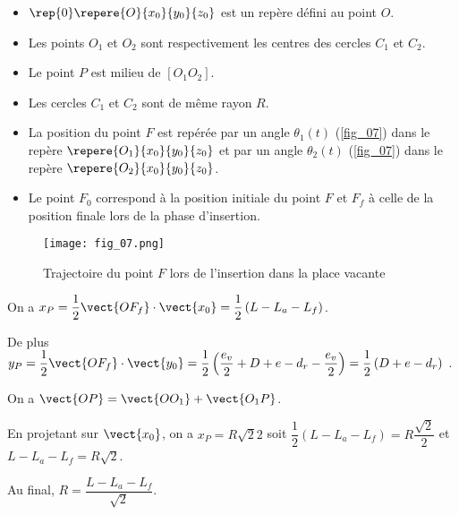 \begin{itemize}
\item $\rep{0} \repere{O}{x_0}{y_0}{z_0}$ est un repère défini au point $O$. 
\item Les points $O_1$ et $O_2$ sont respectivement les centres des cercles $C_1$ et $C_2$.
\item Le point $P$ est milieu de $[O_1 O_2]$.
\item Les cercles $C_1$ et $C_2$ sont de même rayon $R$.
\item La position du point $F$ est repérée par un angle $\theta_1(t)$ (\autoref{fig_07}) dans le repère
$\repere{O_1}{x_0}{y_0}{z_0}$ et par un angle $\theta_2(t)$ (\autoref{fig_07}) dans le repère $\repere{O_2}{x_0}{y_0}{z_0}$.
\item Le point $F_0$ correspond à la position initiale du point $F$ et $F_f$ à celle de la position finale lors de la phase d’insertion.
\end{itemize}


\begin{figure}[H]
\centering
\texttt{[image: fig\_07.png]}
\caption{Trajectoire du point $F$ lors de l’insertion dans la place vacante \label{fig_07}}
\end{figure}

\ifprof
\begin{corrige}
On a $x_P = \dfrac{1}{2} \vect{OF_f}\cdot \vect{x_0} = \dfrac{1}{2}\left(L-L_a - L_f\right)$.

De plus $y_P = \dfrac{1}{2} \vect{OF_f}\cdot \vect{y_0} = \dfrac{1}{2}\left(\dfrac{e_v}{2}+D+e - d_r - \dfrac{e_v}{2} \right)=\dfrac{1}{2}\left(D+e - d_r \right)$ .
\end{corrige}
\else
\fi

\ifprof
\begin{corrige}
On a $\vect{OP}=\vect{OO_1}+\vect{O_1P}$. 

En projetant sur $\vect{x_0}$, on a $x_P =R\sqrt{2}{2}$ soit
$\dfrac{1}{2}\left(L-L_a - L_f\right)=R\dfrac{\sqrt{2}}{2}$ et $L-L_a - L_f=R\sqrt{2}$.

Au final, $R = \dfrac{L-L_a - L_f}{\sqrt{2}}$.
\end{corrige}
\else
\fi

